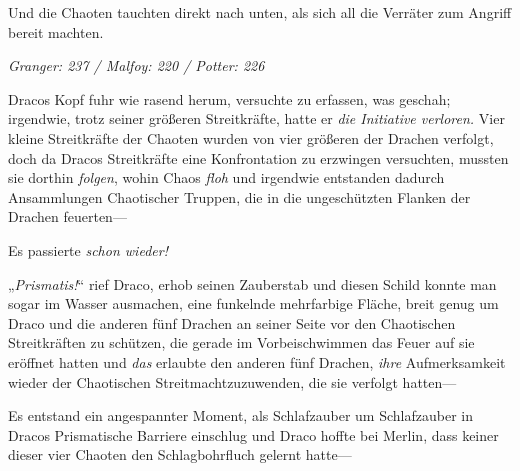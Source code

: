 Und die Chaoten tauchten direkt nach unten, als sich all die Verräter zum Angriff bereit machten.

\later

\emph{Granger: 237 / Malfoy: 220 / Potter: 226}

Dracos Kopf fuhr wie rasend herum, versuchte zu erfassen, was geschah; irgendwie, trotz seiner größeren Streitkräfte, hatte er \emph{die Initiative verloren.} Vier kleine Streitkräfte der Chaoten wurden von vier größeren der Drachen verfolgt, doch da Dracos Streitkräfte eine Konfrontation zu erzwingen versuchten, mussten sie dorthin \emph{folgen}, wohin Chaos \emph{floh} und irgendwie entstanden dadurch Ansammlungen Chaotischer Truppen, die in die ungeschützten Flanken der Drachen feuerten—

Es passierte \emph{schon wieder!}

„\emph{Prismatis!}“ rief Draco, erhob seinen Zauberstab und diesen Schild konnte man sogar im Wasser ausmachen, eine funkelnde mehrfarbige Fläche, breit genug um Draco und die anderen fünf Drachen an seiner Seite vor den Chaotischen Streitkräften zu schützen, die gerade im Vorbeischwimmen das Feuer auf sie eröffnet hatten und \emph{das} erlaubte den anderen fünf Drachen, \emph{ihre} Aufmerksamkeit wieder der Chaotischen Streitmachtzuzuwenden, die sie verfolgt hatten—

Es entstand ein angespannter Moment, als Schlafzauber um Schlafzauber in Dracos Prismatische Barriere einschlug und Draco hoffte bei Merlin, dass keiner dieser vier Chaoten den Schlagbohrfluch gelernt hatte—

